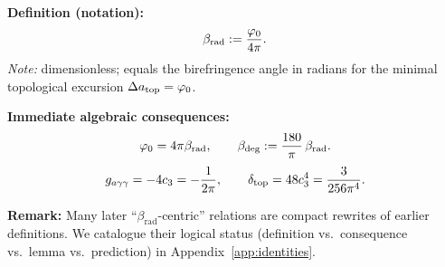 \begin{tcolorbox}[colback=gray!5, colframe=gray!60, breakable,
    title={\textbf{Dictionary: $\beta_{\text{rad}}$ and Canonical Consequences}}, fonttitle=\bfseries\small]
\textbf{Definition (notation):}
\[
\beta_{\text{rad}} := \frac{\varphi_0}{4\pi}.
\]
\textit{Note:} dimensionless; equals the birefringence angle in radians for the minimal topological excursion $\Delta a_{\text{top}}=\varphi_0$.

\textbf{Immediate algebraic consequences:}
\begin{equation}
    \varphi_0 = 4\pi\beta_{\text{rad}}, 
    \qquad 
    \beta_{\text{deg}} := \frac{180}{\pi}\,\beta_{\text{rad}}.
\end{equation}
\begin{equation}
    g_{a\gamma\gamma} = -4c_3 = -\frac{1}{2\pi},
    \qquad
    \delta_{\mathrm{top}} = 48c_3^4 = \frac{3}{256\pi^4}.
\end{equation}

\textbf{Remark:} Many later ``$\beta_{\text{rad}}$-centric'' relations are compact rewrites of earlier definitions. 
We catalogue their logical status (definition vs.\ consequence vs.\ lemma vs.\ prediction) in Appendix~\ref{app:identities}.
\end{tcolorbox}

\TFPTCoreInvariantTable

